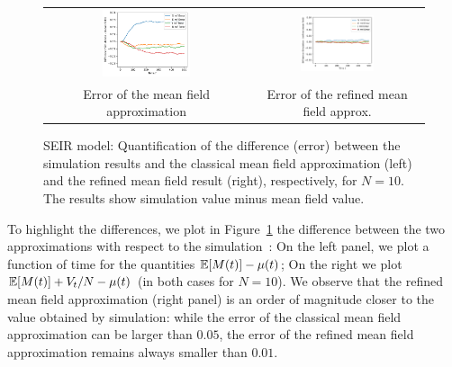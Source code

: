 \documentclass{elsarticle}
\begin{document}
\begin{figure}[ht]
  \begin{center}
    \begin{tabular}{cc}
      \includegraphics[width=0.45\textwidth]{SEIR_errorMF_N10_large} 
      &\includegraphics[width=0.45\textwidth]{SEIR_errorRMF_N10_large}\\
      Error of the mean field approximation
      &
      Error of the refined mean field approx.
    \end{tabular}
\end{center}
\caption{\label{fig:diff} SEIR model: Quantification of the
  difference (error) between the simulation results and the classical
  mean field approximation (left) and the refined mean field result
  (right), respectively, for $N=10$. The results show simulation value
  minus mean field value.}
\end{figure}


To highlight the differences, we plot in Figure~\ref{fig:diff} the
difference between the two approximations with respect to the
simulation~: On the left panel, we plot a function of time for the
quantities $\esp{M(t)}-\mu(t)$; On the right we plot
$\esp{M(t)}+V_t/N-\mu(t)$ (in both cases for $N=10$). We observe that
the refined mean field approximation (right panel) is an order of
magnitude closer to the value obtained by simulation: while the error
of the classical mean field approximation can be larger than $0.05$,
the error of the refined mean field approximation remains always
smaller than $0.01$. 
\end{document}
